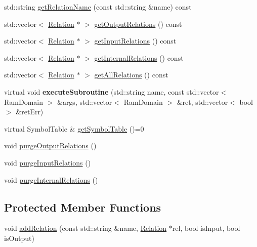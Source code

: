 \begin{DoxyCompactItemize}
\item 
std\+::string \hyperlink{classsouffle_1_1_souffle_program_a1aef3ec37477cc54a5ba982d5aaf6ffc}{get\+Relation\+Name} (const std\+::string \&name) const
\item 
std\+::vector$<$ \hyperlink{classsouffle_1_1_relation}{Relation} $\ast$ $>$ \hyperlink{classsouffle_1_1_souffle_program_af7cfe2c44299205ef9b702f7dc4c9357}{get\+Output\+Relations} () const
\item 
std\+::vector$<$ \hyperlink{classsouffle_1_1_relation}{Relation} $\ast$ $>$ \hyperlink{classsouffle_1_1_souffle_program_adea47c2aa44a8cde5bdf0f39f1281eae}{get\+Input\+Relations} () const
\item 
std\+::vector$<$ \hyperlink{classsouffle_1_1_relation}{Relation} $\ast$ $>$ \hyperlink{classsouffle_1_1_souffle_program_a04d4800b89105587fcd3c9bb25ff34f1}{get\+Internal\+Relations} () const
\item 
std\+::vector$<$ \hyperlink{classsouffle_1_1_relation}{Relation} $\ast$ $>$ \hyperlink{classsouffle_1_1_souffle_program_a01a71a487188c98368cf26e4ac2da43d}{get\+All\+Relations} () const
\item 
\mbox{\label{classsouffle_1_1_souffle_program_ad6101f590d4771ddbe712f9d3f5bbdd1}} 
virtual void {\bfseries execute\+Subroutine} (std\+::string name, const std\+::vector$<$ Ram\+Domain $>$ \&args, std\+::vector$<$ Ram\+Domain $>$ \&ret, std\+::vector$<$ bool $>$ \&ret\+Err)
\item 
virtual Symbol\+Table \& \hyperlink{classsouffle_1_1_souffle_program_a90cd5579baa81512a0137fac420a43e0}{get\+Symbol\+Table} ()=0
\item 
void \hyperlink{classsouffle_1_1_souffle_program_a1e8153fc0d1467855100d423e0d9f089}{purge\+Output\+Relations} ()
\item 
void \hyperlink{classsouffle_1_1_souffle_program_a187e2e268f57646919069ed681dd0bab}{purge\+Input\+Relations} ()
\item 
void \hyperlink{classsouffle_1_1_souffle_program_a6fd5245fc40fd948060be332fe60debf}{purge\+Internal\+Relations} ()
\end{DoxyCompactItemize}
\subsection*{Protected Member Functions}
\begin{DoxyCompactItemize}
\item 
void \hyperlink{classsouffle_1_1_souffle_program_a76d04bb16509820a91b24867c608bc10}{add\+Relation} (const std\+::string \&name, \hyperlink{classsouffle_1_1_relation}{Relation} $\ast$rel, bool is\+Input, bool is\+Output)
\end{DoxyCompactItemize}


